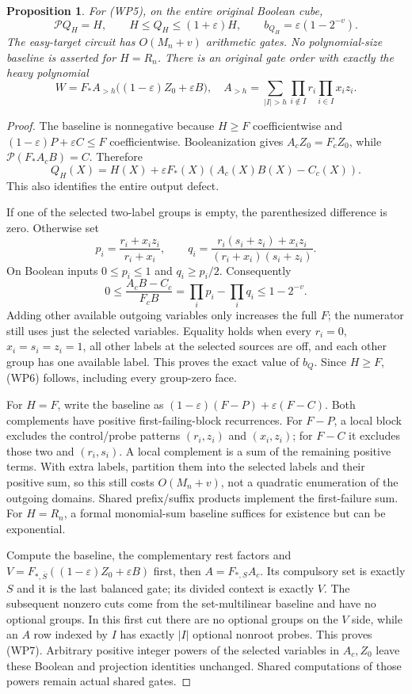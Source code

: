 \documentclass[11pt]{article}
\newtheorem{proposition}{Proposition}
\newcommand{\Pp}{\mathcal P}
\begin{document}
\begin{proposition}
For (WP5), on the entire original Boolean cube,
\[
 \Pp Q_H=H,\qquad
 H\le Q_H\le(1+\varepsilon)H,\qquad
 b_{Q_H}=\varepsilon(1-2^{-v}).                         \tag{WP6}
\]
The easy-target circuit has $O(M_n+v)$ arithmetic gates.
No polynomial-size baseline is asserted for $H=R_n$.
There is an original gate order with exactly the heavy polynomial
\[
 W=F_*A_{>h}\bigl((1-\varepsilon)Z_0+\varepsilon B\bigr),
 \quad
 A_{>h}=\sum_{|I|>h}
       \prod_{i\notin I}r_i\prod_{i\in I}x_i z_i.        \tag{WP7}
\]
\end{proposition}
\begin{proof}
The baseline is nonnegative because $H\ge F$ coefficientwise and
$(1-\varepsilon)P+\varepsilon C\le F$ coefficientwise.
Booleanization gives $A_cZ_0=F_cZ_0$, while
$\Pp(F_*A_cB)=C$. Therefore
\[
 Q_H(X)=H(X)+\varepsilon F_*(X)(A_c(X)B(X)-C_c(X)).
                                                               \tag{WP8}
\]
This also identifies the entire output defect.

If one of the selected two-label groups is empty, the parenthesized
difference is zero. Otherwise set
\[
 p_i=\frac{r_i+x_i z_i}{r_i+x_i},\qquad
 q_i=\frac{r_i(s_i+z_i)+x_i z_i}
           {(r_i+x_i)(s_i+z_i)} .
 \]
On Boolean inputs $0\le p_i\le1$ and $q_i\ge p_i/2$.
Consequently
\[
 0\le\frac{A_cB-C_c}{F_cB}
       =\prod_i p_i-\prod_i q_i\le1-2^{-v}.
 \]
Adding other available outgoing variables only increases the full $F$;
the numerator still uses just the selected variables.
Equality holds when every $r_i=0$, $x_i=s_i=z_i=1$,
all other labels at the selected sources are off, and each other
group has one available label. This proves the exact value of $b_Q$.
Since $H\ge F$, (WP6) follows, including every group-zero face.

For $H=F$, write the baseline as
$(1-\varepsilon)(F-P)+\varepsilon(F-C)$.
Both complements have positive first-failing-block recurrences.
For $F-P$, a local block excludes the control/probe patterns
$(r_i,z_i)$ and $(x_i,z_i)$; for $F-C$ it excludes those two and
$(r_i,s_i)$. A local complement is a sum of the remaining positive
terms. With extra labels, partition them into the selected labels
and their positive sum, so this still costs $O(M_n+v)$, not a
quadratic enumeration of the outgoing domains.
Shared prefix/suffix products implement the first-failure sum.
For $H=R_n$, a formal monomial-sum baseline suffices for existence
but can be exponential.

Compute the baseline, the complementary rest factors and
$V=F_{*,\overline S}((1-\varepsilon)Z_0+\varepsilon B)$ first,
then $A=F_{*,S}A_c$. Its compulsory set is exactly $S$ and it is
the last balanced gate; its divided context is exactly $V$.
The subsequent nonzero cuts come from the set-multilinear baseline
and have no optional groups. In this first cut there are no optional
groups on the $V$ side, while an $A$ row indexed by $I$ has exactly
$|I|$ optional nonroot probes. This proves (WP7).
Arbitrary positive integer powers of the selected variables in
$A_c,Z_0$ leave these Boolean and projection identities unchanged.
Shared computations of those powers remain actual shared gates.
\end{proof}
\end{document}
